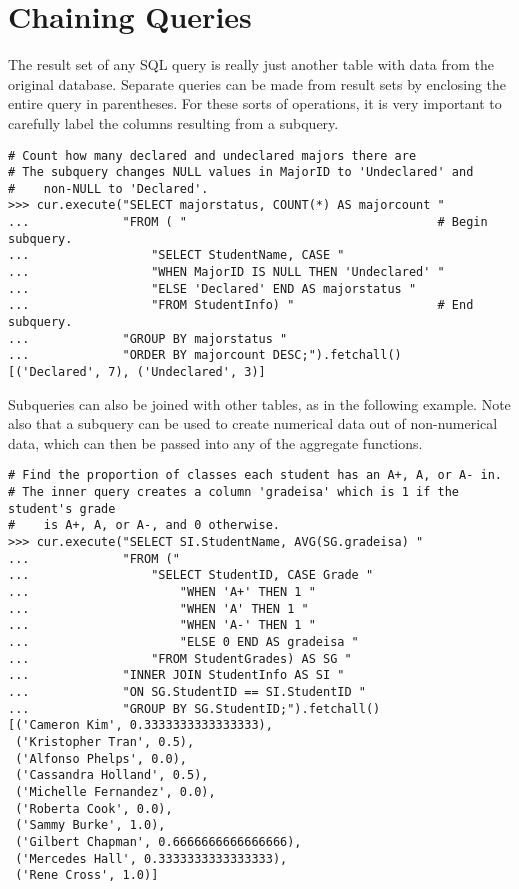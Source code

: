 \section*{Chaining Queries} %

The result set of any SQL query is really just another table with data from the original database.
Separate queries can be made from result sets by enclosing the entire query in parentheses.
For these sorts of operations, it is very important to carefully label the columns resulting from a subquery.

\begin{lstlisting}
# Count how many declared and undeclared majors there are
# The subquery changes NULL values in MajorID to 'Undeclared' and
#    non-NULL to 'Declared'.
>>> cur.execute("SELECT majorstatus, COUNT(*) AS majorcount "
...             "FROM ( "                                   # Begin subquery.
...                 "SELECT StudentName, CASE "
...                 "WHEN MajorID IS NULL THEN 'Undeclared' "
...                 "ELSE 'Declared' END AS majorstatus "
...                 "FROM StudentInfo) "                    # End subquery.
...             "GROUP BY majorstatus "
...             "ORDER BY majorcount DESC;").fetchall()
[('Declared', 7), ('Undeclared', 3)]
\end{lstlisting}

Subqueries can also be joined with other tables, as in the following example.
Note also that a subquery can be used to create numerical data out of non-numerical data, which can then be passed into any of the aggregate functions.
\begin{lstlisting}
# Find the proportion of classes each student has an A+, A, or A- in.
# The inner query creates a column 'gradeisa' which is 1 if the student's grade
#    is A+, A, or A-, and 0 otherwise.
>>> cur.execute("SELECT SI.StudentName, AVG(SG.gradeisa) "
...             "FROM ("
...                 "SELECT StudentID, CASE Grade "
...                     "WHEN 'A+' THEN 1 "
...                     "WHEN 'A' THEN 1 "
...                     "WHEN 'A-' THEN 1 "
...                     "ELSE 0 END AS gradeisa "
...                 "FROM StudentGrades) AS SG "
...             "INNER JOIN StudentInfo AS SI "
...             "ON SG.StudentID == SI.StudentID "
...             "GROUP BY SG.StudentID;").fetchall()
[('Cameron Kim', 0.3333333333333333),
 ('Kristopher Tran', 0.5),
 ('Alfonso Phelps', 0.0),
 ('Cassandra Holland', 0.5),
 ('Michelle Fernandez', 0.0),
 ('Roberta Cook', 0.0),
 ('Sammy Burke', 1.0),
 ('Gilbert Chapman', 0.6666666666666666),
 ('Mercedes Hall', 0.3333333333333333),
 ('Rene Cross', 1.0)]
\end{lstlisting}

